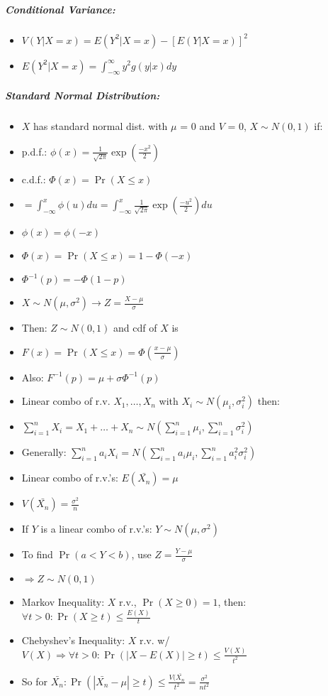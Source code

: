 \documentclass[landscape,10pt]{article}
\begin{document}
\begin{multicols}{4}
\subparagraph*{Conditional Variance: }
\begin{itemize}
    \item[] \(V(Y|X=x) = E(Y^2|X=x) - [E(Y|X=x)]^2\)
    \item[] \(E(Y^2|X=x) = \int_{-\infty}^{\infty}{y^2 g(y|x) dy}\)
\end{itemize}

\subparagraph*{Standard Normal Distribution:}
\begin{itemize}
    \item[] \(X\) has standard normal dist. with \(\mu\) = 0 and \(V\) = 0, \(X \sim N(0,1)\) if:
    \item[] p.d.f.: \( \phi(x) = \frac{1}{\sqrt{2 \pi}}\exp\left (\frac{-x^2}{2}\right)\)
    \item[] c.d.f.: \( 
        \Phi(x) = \Pr(X \leq x) \)
    \item[] \(= \int_{-\infty}^{x}{\phi(u)du}= \int_{-\infty}^{x}{\frac{1}{\sqrt{2 \pi}} \exp\left(\frac{-u^2}{2}\right)du}\)
    \item[] \(\phi(x) = \phi(-x)\)
    \item[] \(\Phi(x) = \Pr(X \leq x) = 1 - \Phi(-x)\)
    \item[] \(\Phi^{-1}(p) = -\Phi(1-p)\)
    \item[] \(X \sim N(\mu, \sigma^2) \rightarrow Z = \frac{X-\mu}{\sigma}\)
    \item[] Then: \(Z \sim N(0,1)\) and cdf of \(X\) is
    \item[] \(F(x) = \Pr(X \leq x) = \Phi(\frac{x-\mu}{\sigma})\)
    \item[] Also: \(F^{-1}(p) = \mu + \sigma \Phi^{-1}(p)\)
    \item[] Linear combo of r.v. \(X_1, \ldots, X_n\) with \(X_i \sim N(\mu_i, \sigma_i^2)\) then:
    \item[] \(\sum\limits_{i = 1}^{n}{X_i} = X_1 + \ldots + X_n \sim N(\sum\limits_{i = 1}^{n} \mu_i, \sum\limits_{i = 1}^{n} \sigma_i^2)\)
    \item[] Generally: \(\sum\limits_{i = 1}^{n}{a_i X_i} = N(\sum\limits_{i = 1}^{n}{a_i \mu_i}, \sum\limits_{i = 1}^{n}{a_i^2 \sigma_i^2})\)
    \item[] Linear combo of r.v.'s: \(E(\bar{X_n}) =  \mu\)
    \item[] \(V(\bar{X_n}) = \frac{\sigma^2}{n}\)
    \item[] If \(Y\) is a linear combo of r.v.'s: \(Y \sim N(\mu, \sigma^2)\)
    \item[] To find \(\Pr(a < Y < b)\), use \(Z = \frac{Y-\mu}{\sigma}\)
    \item[] \(\Rightarrow Z \sim N(0,1)\)
    \item[] Markov Inequality: \(X\) r.v., \(\Pr(X \geq 0) = 1\), then: \(\forall t > 0: \Pr(X \geq t) \leq \frac{E(X)}{t}\)
    \item[] Chebyshev's Inequality: \(X\) r.v. w/ \(V(X) \Rightarrow \forall t > 0: \Pr(|X - E(X)| \geq t) \leq \frac{V(X)}{t^2}\)
    \item[] So for \(\bar{X_n}: \Pr(|\bar{X_n} - \mu|\geq t) \leq \frac{V(\bar{X_n}}{t^2} = \frac{\sigma^2}{nt^2}\)
\end{itemize}


\end{multicols}
\end{document}
